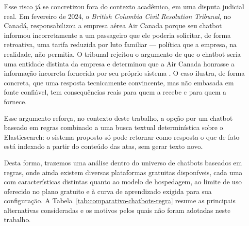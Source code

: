 Esse risco já se concretizou fora do contexto acadêmico, em uma disputa judicial real. Em fevereiro de 2024, o \textit{British Columbia Civil Resolution Tribunal}, no Canadá, responsabilizou a empresa aérea Air Canada porque seu chatbot informou incorretamente a um passageiro que ele poderia solicitar, de forma retroativa, uma tarifa reduzida por luto familiar — política que a empresa, na realidade, não permitia. O tribunal rejeitou o argumento de que o chatbot seria uma entidade distinta da empresa e determinou que a Air Canada honrasse a informação incorreta fornecida por seu próprio sistema \cite{aircanada-cbc, aircanada-aba}. O caso ilustra, de forma concreta, que uma resposta tecnicamente convincente, mas não embasada em fonte confiável, tem consequências reais para quem a recebe e para quem a fornece.

Esse argumento reforça, no contexto deste trabalho, a opção por um chatbot baseado em regras combinado a uma busca textual determinística sobre o Elasticsearch: o sistema proposto só pode retornar como resposta o que de fato está indexado a partir do conteúdo das atas, sem gerar texto novo. 

Desta forma, trazemos uma análise dentro do universo de chatbots baseados em regras, onde ainda existem diversas plataformas gratuitas disponíveis, cada uma com características distintas quanto ao modelo de hospedagem, ao limite de uso oferecido no plano gratuito e à curva de aprendizado exigida para sua configuração. A Tabela~\ref{tab:comparativo-chatbots-regra} resume as principais alternativas consideradas e os motivos pelos quais não foram adotadas neste trabalho.

